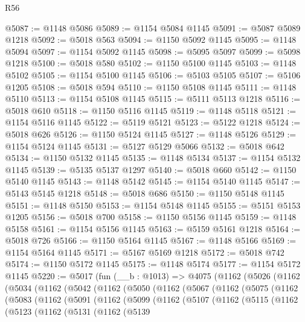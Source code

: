 \begin{lexlean}{R56}
\begin{coremodule}
@5087 := @1148 @5086
@5089 := @1154 @5084 @1145
@5091 := @5087 @5089 @1218
@5092 := @5018 @563
@5094 := @1150 @5092 @1145
@5095 := @1148 @5094
@5097 := @1154 @5092 @1145
@5098 := @5095 @5097
@5099 := @5098 @1218
@5100 := @5018 @580
@5102 := @1150 @5100 @1145
@5103 := @1148 @5102
@5105 := @1154 @5100 @1145
@5106 := @5103 @5105
@5107 := @5106 @1205
@5108 := @5018 @594
@5110 := @1150 @5108 @1145
@5111 := @1148 @5110
@5113 := @1154 @5108 @1145
@5115 := @5111 @5113 @1218
@5116 := @5018 @610
@5118 := @1150 @5116 @1145
@5119 := @1148 @5118
@5121 := @1154 @5116 @1145
@5122 := @5119 @5121
@5123 := @5122 @1218
@5124 := @5018 @626
@5126 := @1150 @5124 @1145
@5127 := @1148 @5126
@5129 := @1154 @5124 @1145
@5131 := @5127 @5129 @5066
@5132 := @5018 @642
@5134 := @1150 @5132 @1145
@5135 := @1148 @5134
@5137 := @1154 @5132 @1145
@5139 := @5135 @5137 @1297
@5140 := @5018 @660
@5142 := @1150 @5140 @1145
@5143 := @1148 @5142
@5145 := @1154 @5140 @1145
@5147 := @5143 @5145 @1218
@5148 := @5018 @686
@5150 := @1150 @5148 @1145
@5151 := @1148 @5150
@5153 := @1154 @5148 @1145
@5155 := @5151 @5153 @1205
@5156 := @5018 @700
@5158 := @1150 @5156 @1145
@5159 := @1148 @5158
@5161 := @1154 @5156 @1145
@5163 := @5159 @5161 @1218
@5164 := @5018 @726
@5166 := @1150 @5164 @1145
@5167 := @1148 @5166
@5169 := @1154 @5164 @1145
@5171 := @5167 @5169 @1218
@5172 := @5018 @742
@5174 := @1150 @5172 @1145
@5175 := @1148 @5174
@5177 := @1154 @5172 @1145
@5220 := @5017
    (fun (__b : @1013) =>
    @4075
      (@1162
        (@5026
          (@1162
            (@5034
              (@1162
                (@5042
                  (@1162
                    (@5050
                      (@1162
                        (@5067
                          (@1162
                            (@5075
                              (@1162
                                (@5083
                                  (@1162
                                    (@5091
                                      (@1162
                                        (@5099
                                          (@1162
                                            (@5107
                                              (@1162
                                                (@5115
                                                  (@1162
                                                    (@5123
                                                      (@1162
                                                        (@5131
                                                          (@1162
                                                            (@5139

\end{coremodule}
\end{lexlean}
